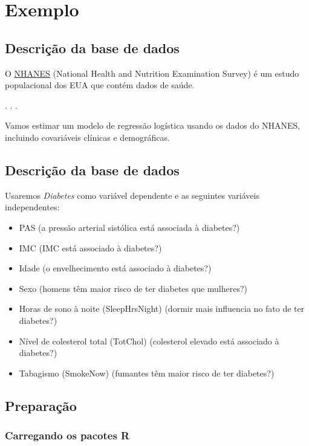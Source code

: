\documentclass[
  letterpaper,
  DIV=11,
  numbers=noendperiod]{scrartcl}
\providecommand{\tightlist}{%
  \setlength{\itemsep}{0pt}\setlength{\parskip}{0pt}}\usepackage{longtable,booktabs,array}
\begin{document}
\section{Exemplo}\label{exemplo-1}

\subsection{Descrição da base de
dados}\label{descriuxe7uxe3o-da-base-de-dados-2}

O \href{https://www.cdc.gov/nchs/nhanes/index.html}{NHANES} (National
Health and Nutrition Examination Survey) é um estudo populacional dos
EUA que contém dados de saúde.

. . .

Vamos estimar um modelo de regressão logística usando os dados do
NHANES, incluindo covariáveis clínicas e demográficas.

\subsection{Descrição da base de
dados}\label{descriuxe7uxe3o-da-base-de-dados-3}

Usaremos \emph{Diabetes} como variável dependente e as seguintes
variáveis independentes:

\begin{itemize}
\tightlist
\item
  PAS (a pressão arterial sistólica está associada à diabetes?)
\item
  IMC (IMC está associado à diabetes?)
\item
  Idade (o envelhecimento está associado à diabetes?)
\item
  Sexo (homens têm maior risco de ter diabetes que mulheres?)
\item
  Horas de sono à noite (SleepHrsNight) (dormir mais influencia no fato
  de ter diabetes?)
\item
  Nível de colesterol total (TotChol) (colesterol elevado está associado
  à diabetes?)
\item
  Tabagismo (SmokeNow) (fumantes têm maior risco de ter diabetes?)
\end{itemize}

\subsection{Preparação}\label{preparauxe7uxe3o-1}

\subsubsection{Carregando os pacotes R}\label{carregando-os-pacotes-r-1}
\end{document}
